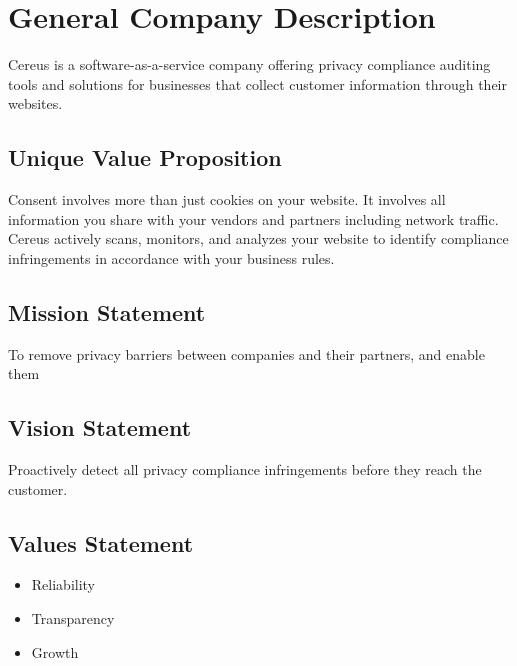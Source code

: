 {\let\cleardoublepage\relax \chapter{General Company Description}}

Cereus is a software-as-a-service company offering privacy compliance auditing tools and solutions for businesses that collect customer information through their websites.

{\let\clearpage\relax \section{Unique Value Proposition}}

Consent involves more than just cookies on your website. It involves all information you share with your vendors and partners including network traffic. Cereus actively scans, monitors, and analyzes your website to identify compliance infringements in accordance with your business rules.

{\let\clearpage\relax \section{Mission Statement}}

To remove privacy barriers between companies and their partners, and enable them %


\section{Vision Statement}

Proactively detect all privacy compliance infringements before they reach the customer. 

\section{Values Statement}

\begin{itemize}
  \item Reliability
  \item Transparency
  \item Growth
\end{itemize}

